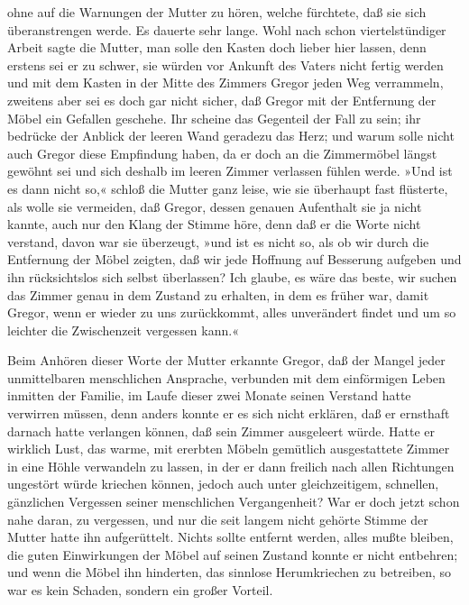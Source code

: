 ohne auf die Warnungen der Mutter zu hören, welche fürchtete, daß sie
sich überanstrengen werde. Es dauerte sehr lange. Wohl nach schon
viertelstündiger Arbeit sagte die Mutter, man solle den Kasten doch
lieber hier lassen, denn erstens sei er zu schwer, sie würden vor
Ankunft des Vaters nicht fertig werden und mit dem Kasten in der Mitte
des Zimmers Gregor jeden Weg verrammeln, zweitens aber sei es doch gar
nicht sicher, daß Gregor mit der Entfernung der Möbel ein Gefallen
geschehe. Ihr scheine das Gegenteil der Fall zu sein; ihr bedrücke der
Anblick der leeren Wand geradezu das Herz; und warum solle nicht auch
Gregor diese Empfindung haben, da er doch an die Zimmermöbel längst
gewöhnt sei und sich deshalb im leeren Zimmer verlassen fühlen werde.
»Und ist es dann nicht so,« schloß die Mutter ganz leise, wie sie
überhaupt fast flüsterte, als wolle sie vermeiden, daß Gregor, dessen
genauen Aufenthalt sie ja nicht kannte, auch nur den Klang der Stimme
höre, denn daß er die Worte nicht verstand, davon war sie überzeugt,
»und ist es nicht so, als ob wir durch die Entfernung der Möbel zeigten,
daß wir jede Hoffnung auf Besserung aufgeben und ihn rücksichtslos sich
selbst überlassen? Ich glaube, es wäre das beste, wir suchen das Zimmer
genau in dem Zustand zu erhalten, in dem es früher war, damit Gregor,
wenn er wieder zu uns zurückkommt, alles unverändert findet und um so
leichter die Zwischenzeit vergessen kann.«

Beim Anhören dieser Worte der Mutter erkannte Gregor, daß der Mangel
jeder unmittelbaren menschlichen Ansprache, verbunden mit dem
einförmigen Leben inmitten der Familie, im Laufe dieser zwei Monate
seinen Verstand hatte verwirren müssen, denn anders konnte er es sich
nicht erklären, daß er ernsthaft darnach hatte verlangen können, daß
sein Zimmer ausgeleert würde. Hatte er wirklich Lust, das warme, mit
ererbten Möbeln gemütlich ausgestattete Zimmer in eine Höhle verwandeln
zu lassen, in der er dann freilich nach allen Richtungen ungestört würde
kriechen können, jedoch auch unter gleichzeitigem, schnellen, gänzlichen
Vergessen seiner menschlichen Vergangenheit? War er doch jetzt schon
nahe daran, zu vergessen, und nur die seit langem nicht gehörte Stimme
der Mutter hatte ihn aufgerüttelt. Nichts sollte entfernt werden, alles
mußte bleiben, die guten Einwirkungen der Möbel auf seinen Zustand
konnte er nicht entbehren; und wenn die Möbel ihn hinderten, das
sinnlose Herumkriechen zu betreiben, so war es kein Schaden, sondern ein
großer Vorteil.

